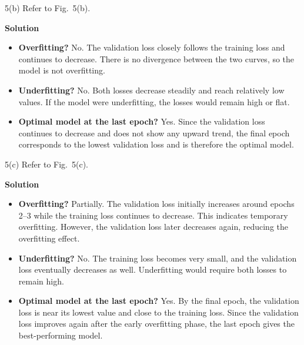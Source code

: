 \documentclass[11pt]{article}
\begin{document}
	5(b) Refer to Fig.\ 5(b).
	
	\noindent\textbf{Solution}
	
	\begin{itemize}
		\item \textbf{Overfitting?}  
		No. The validation loss closely follows the training loss and continues to decrease. There is no divergence between the two curves, so the model is not overfitting.
		
		\item \textbf{Underfitting?}  
		No. Both losses decrease steadily and reach relatively low values. If the model were underfitting, the losses would remain high or flat.
		
		\item \textbf{Optimal model at the last epoch?}  
		Yes. Since the validation loss continues to decrease and does not show any upward trend, the final epoch corresponds to the lowest validation loss and is therefore the optimal model.
	\end{itemize}
	
	5(c) Refer to Fig.\ 5(c).
	
	\noindent\textbf{Solution}
	
	\begin{itemize}
		\item \textbf{Overfitting?}  
		Partially. The validation loss initially increases around epochs 2--3 while the training loss continues to decrease. This indicates temporary overfitting. However, the validation loss later decreases again, reducing the overfitting effect.
		
		\item \textbf{Underfitting?}  
		No. The training loss becomes very small, and the validation loss eventually decreases as well. Underfitting would require both losses to remain high.
		
		\item \textbf{Optimal model at the last epoch?}  
		Yes. By the final epoch, the validation loss is near its lowest value and close to the training loss. Since the validation loss improves again after the early overfitting phase, the last epoch gives the best-performing model.
	\end{itemize}
	
	\vspace{1em}
	
\end{document}
